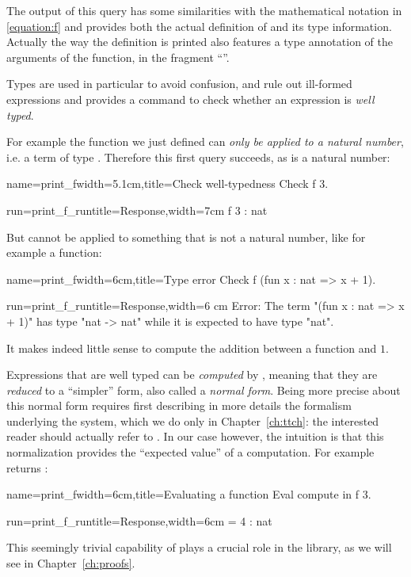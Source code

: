 The output of this  query has some similarities with the
 mathematical notation in \eqref{equation:f} and provides both the
 actual definition of  and its type information. Actually the way
 the definition is printed also features a type annotation of the
 arguments of the function, in the fragment ``''.

Types are used in particular to avoid confusion, and rule out
ill-formed expressions and \Coq{} provides a command to check whether
an expression is \emph{well typed}.

For example the function  we just defined can \emph{only be
  applied to a natural number}, i.e. a term of type . Therefore
this first query succeeds, as  is a natural number:

\begin{coq}{name=print_f}{width=5.1cm,title=Check well-typedness}
Check f 3.
\end{coq}
\begin{coqout}{run=print_f_run}{title=Response,width=7cm}
 f 3 : nat
\end{coqout}
But  cannot be applied to something that is not a natural number,
like for example a function:

\begin{coq}{name=print_f}{width=6cm,title=Type error}
Check f (fun x : nat => x + 1).
$~$
$~$
\end{coq}
\begin{coqout}{run=print_f_run}{title=Response,width=6
cm}
Error:
The term "(fun x : nat => x + 1)"
has type "nat -> nat" while it is
expected to have type "nat".
\end{coqout}
It makes indeed little sense to compute the addition between
a function and $1$.

Expressions that are well typed can be \emph{computed} by \Coq{},
meaning that they are \emph{reduced} to a ``simpler'' form, also
called a \emph{normal form}. Being more precise about this normal form
requires first describing in more details the formalism underlying the
\Coq{} system, which we do only in Chapter~\ref{ch:ttch}: the
interested reader should actually refer to \cite[Section
8.7.1]{Coq:manual}. In our case however, the intuition is that this
normalization provides the ``expected value'' of a computation.
For example  returns :

\begin{coq}{name=print_f}{width=6cm,title=Evaluating a function}
Eval compute in f 3.
\end{coq}
\begin{coqout}{run=print_f_run}{title=Response,width=6cm}
 = 4 : nat
\end{coqout}
This seemingly trivial capability of \Coq{} plays a crucial role
in the \mcbMC{} library, as we will see in Chapter~\ref{ch:proofs}.

